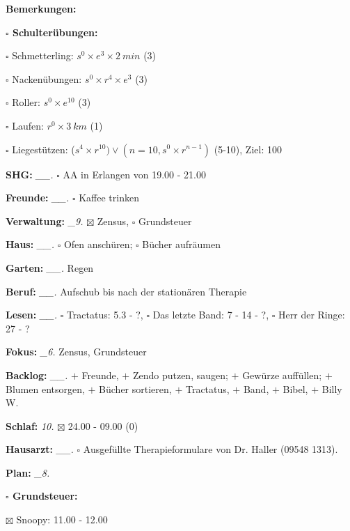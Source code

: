 \documentclass[10pt,a4paper]{article}
\newcommand\prop[1] {{\color {alizarin} {\bf #1}}}             %
\newcommand\opti[1] {{\color {amethyst} {\bf #1}}}             %
\newcommand\mand[1] {{\color {burntorange} {\bf #1}}}          %
\newcommand\topspace{\vskip -15pt \hskip 20pt}
\newcommand\bottomspace{\vskip 4pt}
\newcommand\n[1] { {\sl #1.} \hskip 5pt }
\begin{document}
\begin{mdframed}[style=daystyle]
\begin{labeling}{{\mand {Bemerkungen:}}}
\begin{minipage}{0.75\textwidth}
\begin{labeling}{\prop {$\square$ {Schulterübungen:}}}
      \item[$\square$ Schmetterling:]   $s^0 \times e^3 \times 2\ min$ (3)
      \item[$\square$ Nackenübungen:]   $s^0 \times r^4 \times e^3$ (3)
      \item[$\square$ Roller:]          $s^0 \times e^{10}$ (3)
      \item[$\square$ Laufen:]          $r^0 \times 3\ km$ (1)
      \item[$\square$ Liegestützen:]    ($s^4 \times r^{10}) \vee (n=10, s^0 \times r^{n-1})$ (5-10), Ziel: 100
      \end{labeling}
    \end{minipage}
    \bottomspace        
  \item[{\mand {SHG:}}]          \n{\_\_} $\square$ AA in Erlangen von 19.00 - 21.00
  \item[{\mand {Freunde:}}]      \n{\_\_} $\square$ Kaffee trinken
  \item[{\mand {Verwaltung:}}]    \n{\_9} $\boxtimes$ Zensus, $\square$ Grundsteuer
  \item[{\mand {Haus:}}]         \n{\_\_} $\square$ Ofen anschüren; $\square$ Bücher aufräumen
  \item[{\mand {Garten:}}]       \n{\_\_} Regen
  \item[{\mand {Beruf:}}]        \n{\_\_} Aufschub bis nach der stationären Therapie
  \item[{\mand {Lesen:}}]        \n{\_\_} $\square$ Tractatus: 5.3 - ?,
      $\square$ Das letzte Band: 7 - 14 - ?, $\square$ Herr der Ringe: 27 - ?
  \item[{\mand {Fokus:}}]         \n{\_6} Zensus, Grundsteuer
  \item[{\mand {Backlog:}}]      \n{\_\_} $+$ Freunde,
    $+$ Zendo putzen, saugen; $+$ Gewürze auffüllen; $+$ Blumen entsorgen, $+$ Bücher sortieren,
    $+$ Tractatus, $+$ Band, $+$ Bibel, $+$ Billy W.
  \item[{\mand {Schlaf:}}]         \n{10} $\boxtimes$ 24.00 - 09.00 (0)
  \item[{\opti {Hausarzt:}}]     \n{\_\_} $\square$ Ausgefüllte Therapieformulare von
    Dr. Haller (09548 1313). 
  \item[{\mand {Plan:}}]          \n{\_8}
    \topspace
    \begin{minipage}{0.75\textwidth}  
      \begin{labeling}{\prop {$\square$ {Grundsteuer:}}} 
        \setlength\itemsep{-3pt}
      \item[$\boxtimes$ Snoopy:]    11.00 - 12.00

\end{labeling}
\end{minipage}
\end{labeling}
\end{mdframed}
\end{document}
